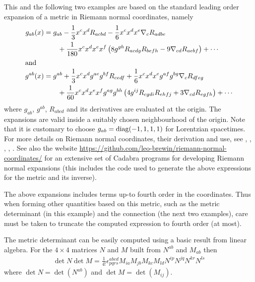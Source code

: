 \documentclass[a4paper,12pt]{article}
\numberwithin{equation}{section}%
\begin{document}
This and the following two examples are based on the standard leading order
expansion of a metric in Riemann normal coordinates, namely
\begin{align}
   g_{ab}(x)
   &= g_{a b}
   - \frac{1}{3} x^{c} x^{d} R_{a c b d}
   - \frac{1}{6} x^{c} x^{d} x^{e} \nabla_{c}{R_{a d b e}}\notag\\
   &\qquad + \frac{1}{180} x^{c} x^{d} x^{e} x^{f}
                           \left( 8g^{g h} R_{a c d g} R_{b e f h}
                                 -9\nabla_{c d}{R_{a e b f}}\right)
   + \cdots
   \label{ex-10:rncgab}\\
\intertext{and}
   g^{ab}(x)
   &= g^{a b}
   + \frac{1}{3} x^{c} x^{d} g^{a e} g^{b f} R_{c e d f}
   + \frac{1}{6} x^{c} x^{d} x^{e} g^{a f} g^{b g} \nabla_{c}{R_{d f e g}}\notag\\
   &\qquad + \frac{1}{60} x^{c} x^{d} x^{e} x^{f} g^{a g} g^{b h}
                          \left( 4 g^{i j} R_{c g d i} R_{e h f j}
                                +3 \nabla_{c d}{R_{e g f h}}\right)
   + \cdots
   \label{ex-10:rnciab}
\end{align}
where $g_{ab}$, $g^{ab}$, $R_{abcd}$ and its derivatives are evaluated at the origin. The
expansions are valid inside a suitably chosen neighbourhood of the origin. Note that it is
customary to choose $g_{ab}={\rm diag}(-1,1,1,1)$ for Lorentzian spacetimes. For more
details on Riemann normal coordinates, their derivation and use, see
\cite{chern-chen-lam:2000-01},
\cite{chavel:2006-01},
\cite{eisenhart:1926-01},
\cite{gray:1973-01}, \cite{willmore:1996-01}.
See also the website \url{https://github.com/leo-brewin/riemann-normal-coordinates/} for an
extensive set of Cadabra programs for developing Riemann normal expansions (this includes
the code used to generate the above expressions for the metric and its inverse).

The above expansions includes terms up-to fourth order in the coordinates. Thus when forming
other quantities based on this metric, such as the metric determinant (in this example) and
the connection (the next two examples), care must be taken to truncate the computed
expression to fourth order (at most).

The metric determinant can be easily computed using a basic result from linear algebra. For
the $4\times 4$ matrices $N$ and $M$ built from $N^{a b}$ and $M_{a b}$ then
\begin{align*}
   \det N \det M = \frac{1}{4!} \epsilon^{abcd}_{pqrs} M_{ia} M_{jb} M_{kc} M_{ld}
                                                       N^{ip} N^{jq} N^{kr} N^{ls}
\end{align*}
where $\det N = \det(N^{a b})$ and $\det M = \det(M_{i j})$.
\end{document}
